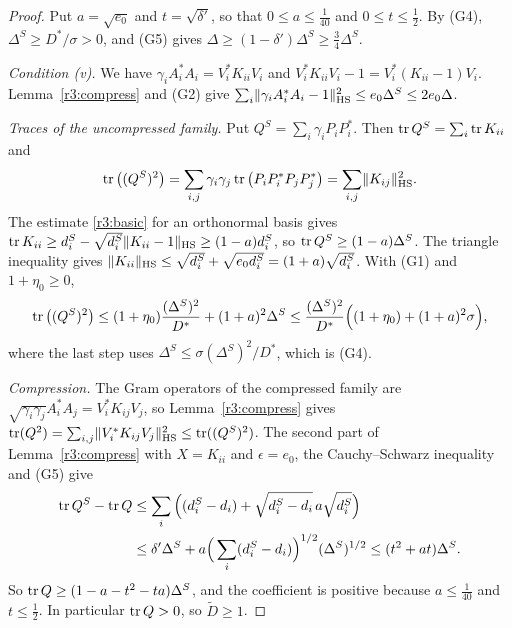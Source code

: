 \begin{proof}
Put $a=\sqrt{e_0}$ and $t=\sqrt{\delta'}$, so that $0\le a\le\frac1{40}$ and $0\le t\le\frac12$. By (G4), $\Delta^S\ge D^*/\sigma>0$, and (G5) gives $\Delta\ge(1-\delta')\Delta^S\ge\frac34\Delta^S$.

\emph{Condition (v).} We have $\gamma_iA_i^*A_i=V_i^*K_{ii}V_i$ and $V_i^*K_{ii}V_i-1=V_i^*(K_{ii}-1)V_i$. Lemma~\ref{r3:compress} and (G2) give $\sum_i\lVert\gamma_iA_i^*A_i-1\rVert_{\mathrm{HS}}^2\le e_0\Delta^S\le2e_0\Delta$.

\emph{Traces of the uncompressed family.} Put $Q^S=\sum_i\gamma_iP_iP_i^*$. Then $\operatorname{tr} Q^S=\sum_i\operatorname{tr} K_{ii}$ and
\[
\operatorname{tr}\big((Q^S)^2\big)=\sum_{i,j}\gamma_i\gamma_j\operatorname{tr}\big(P_iP_i^*P_jP_j^*\big)=\sum_{i,j}\lVert K_{ij}\rVert_{\mathrm{HS}}^2 .
\]
The estimate \eqref{r3:basic} for an orthonormal basis gives $\operatorname{tr} K_{ii}\ge d^S_i-\sqrt{d^S_i}\lVert K_{ii}-1\rVert_{\mathrm{HS}}\ge(1-a)d^S_i$, so $\operatorname{tr} Q^S\ge(1-a)\Delta^S$. The triangle inequality gives $\lVert K_{ii}\rVert_{\mathrm{HS}}\le\sqrt{d^S_i}+\sqrt{e_0d^S_i}=(1+a)\sqrt{d^S_i}$. With (G1) and $1+\eta_0\ge0$,
\[
\operatorname{tr}\big((Q^S)^2\big)\le(1+\eta_0)\frac{(\Delta^S)^2}{D^*}+(1+a)^2\Delta^S\le\frac{(\Delta^S)^2}{D^*}\Big((1+\eta_0)+(1+a)^2\sigma\Big),
\]
where the last step uses $\Delta^S\le\sigma(\Delta^S)^2/D^*$, which is (G4).

\emph{Compression.} The Gram operators of the compressed family are $\sqrt{\gamma_i\gamma_j}A_i^*A_j=V_i^*K_{ij}V_j$, so Lemma~\ref{r3:compress} gives $\operatorname{tr}(Q^2)=\sum_{i,j}\lVert V_i^*K_{ij}V_j\rVert_{\mathrm{HS}}^2\le\operatorname{tr}((Q^S)^2)$. The second part of Lemma~\ref{r3:compress} with $X=K_{ii}$ and $\epsilon=e_0$, the Cauchy--Schwarz inequality and (G5) give
\begin{align*}
\operatorname{tr} Q^S-\operatorname{tr} Q&\le\sum_i\Big((d^S_i-d_i)+\sqrt{d^S_i-d_i}\,a\sqrt{d^S_i}\Big)\\
&\le\delta'\Delta^S+a\Big(\sum_i(d^S_i-d_i)\Big)^{1/2}(\Delta^S)^{1/2}\le(t^2+at)\Delta^S .
\end{align*}
So $\operatorname{tr} Q\ge(1-a-t^2-ta)\Delta^S$, and the coefficient is positive because $a\le\frac1{40}$ and $t\le\frac12$. In particular $\operatorname{tr} Q>0$, so $\widetilde D\ge1$.


\end{proof}
